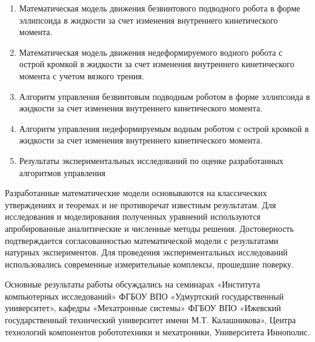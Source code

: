 {}
\begin{enumerate}
  \item Математическая модель движения безвинтового подводного робота в форме эллипсоида в жидкости за счет изменения внутреннего кинетического момента.
  \item Математическая модель движения недеформируемого водного робота с острой кромкой в жидкости за счет изменения внутреннего кинетического момента с учетом вязкого трения.
  \item Алгоритм управления безвинтовым подводным роботом в форме эллипсоида в жидкости за счет изменения внутреннего кинетического момента.
  \item Алгоритм управления недеформируемым водным роботом с острой кромкой в жидкости за счет изменения внутреннего кинетического момента.
  \item Результаты экспериментальных исследований по оценке разработанных алгоритмов управления
  
\end{enumerate}

{\reliability} Разработанные математические модели основываются на классических утверждениях и теоремах и не противоречат известным результатам. Для исследования и моделирования полученных уравнений используются апробированные аналитические и численные методы решения. Достоверность подтверждается согласованностью математической модели с результатами натурных экспериментов. Для проведения экспериментальных исследований использовались современные измерительные комплексы, прошедшие поверку.


{\probation}
Основные результаты работы обсуждались на семинарах «Института компьютерных исследований» ФГБОУ ВПО «Удмуртский государственный университет», кафедры «Мехатронные системы» ФГБОУ ВПО «Ижевский государственный технический университет имени М.Т. Калашникова», Центра технологий компонентов робототехники и мехатроники, Университета Иннополис.

